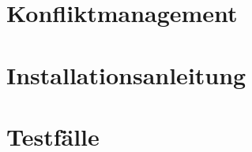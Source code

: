 \section{\label{chap:konfliktmanagement}Konfliktmanagement}

%
%
\section{Installationsanleitung}


%
%
\section{\label{chap:impl:test}Testfälle}
